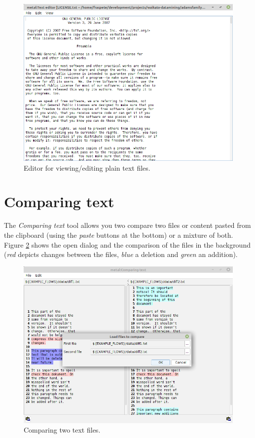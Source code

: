 \begin{figure}[htb]
  \centering
  \includegraphics[width=12.0cm]{images/texteditor.png}
  \caption{Editor for viewing/editing plain text files.}
  \label{texteditor}
\end{figure}

\clearpage
\newpage
\section{Comparing text}
The \textit{Comparing text} tool allows you two compare two files or content 
pasted from the clipboard (using the \textit{paste} buttons at the bottom) or
a mixture of both. Figure \ref{diff-files} shows the open dialog and the
comparison of the files in the background (\textit{red} depicts changes 
between the files, \textit{blue} a deletion and \textit{green} an addition).

\begin{figure}[htb]
  \centering
  \includegraphics[width=12.0cm]{images/diff-files.png}
  \caption{Comparing two text files.}
  \label{diff-files}
\end{figure}

